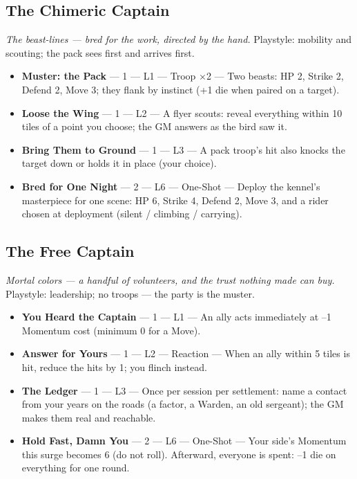 \subsection{The Chimeric Captain}
\textit{The beast-lines --- bred for the work, directed by the hand.} Playstyle: mobility and scouting; the pack sees first and arrives first.
\begin{itemize}
    \item \textbf{Muster: the Pack} --- 1 --- L1 --- Troop ×2 --- Two beasts: HP 2, Strike 2, Defend 2, Move 3; they flank by instinct (+1 die when paired on a target).
    \item \textbf{Loose the Wing} --- 1 --- L2 --- A flyer scouts: reveal everything within 10 tiles of a point you choose; the GM answers as the bird saw it.
    \item \textbf{Bring Them to Ground} --- 1 --- L3 --- A pack troop's hit also knocks the target down or holds it in place (your choice).
    \item \textbf{Bred for One Night} --- 2 --- L6 --- One-Shot --- Deploy the kennel's masterpiece for one scene: HP 6, Strike 4, Defend 2, Move 3, and a rider chosen at deployment (silent / climbing / carrying).
\end{itemize}

\subsection{The Free Captain}
\textit{Mortal colors --- a handful of volunteers, and the trust nothing made can buy.} Playstyle: leadership; no troops --- the party is the muster.
\begin{itemize}
    \item \textbf{You Heard the Captain} --- 1 --- L1 --- An ally acts immediately at --1 Momentum cost (minimum 0 for a Move).
    \item \textbf{Answer for Yours} --- 1 --- L2 --- Reaction --- When an ally within 5 tiles is hit, reduce the hits by 1; you flinch instead.
    \item \textbf{The Ledger} --- 1 --- L3 --- Once per session per settlement: name a contact from your years on the roads (a factor, a Warden, an old sergeant); the GM makes them real and reachable.
    \item \textbf{Hold Fast, Damn You} --- 2 --- L6 --- One-Shot --- Your side's Momentum this surge becomes 6 (do not roll). Afterward, everyone is spent: --1 die on everything for one round.
\end{itemize}

